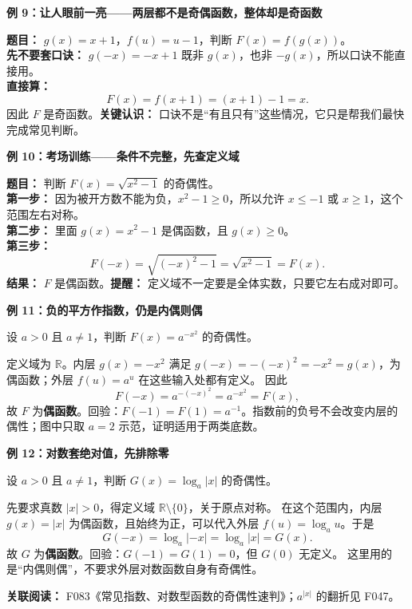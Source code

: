 \clearpage
\begin{examplebox}
\textbf{\textcolor{CExample}{例 9：让人眼前一亮——两层都不是奇偶函数，整体却是奇函数}}


\textbf{题目：} $g(x)=x+1$，$f(u)=u-1$，判断 $F(x)=f(g(x))$。\\
\textbf{先不要套口诀：} $g(-x)=-x+1$ 既非 $g(x)$，也非 $-g(x)$，所以口诀不能直接用。\\
\textbf{直接算：}
\[
F(x)=f(x+1)=(x+1)-1=x.
\]
因此 $F$ 是奇函数。\textbf{关键认识：} 口诀不是“有且只有”这些情况，它只是帮我们最快完成常见判断。

\medskip

\end{examplebox}
\clearpage
\begin{examplebox}
\textbf{\textcolor{CExample}{例 10：考场训练——条件不完整，先查定义域}}


\textbf{题目：} 判断 $F(x)=\sqrt{x^2-1}$ 的奇偶性。\\
\textbf{第一步：} 因为被开方数不能为负，$x^2-1\geqslant0$，所以允许 $x\leqslant-1$ 或 $x\geqslant1$，这个范围左右对称。\\
\textbf{第二步：} 里面 $g(x)=x^2-1$ 是偶函数，且 $g(x)\geqslant0$。\\
\textbf{第三步：}
\[
F(-x)=\sqrt{(-x)^2-1}=\sqrt{x^2-1}=F(x).
\]
\textbf{结果：} $F$ 是偶函数。\textbf{提醒：} 定义域不一定要是全体实数，只要它左右成对即可。
\end{examplebox}
\clearpage
\begin{examplebox}
\textbf{\textcolor{CExample}{例 11：负的平方作指数，仍是内偶则偶}}

设 $a>0$ 且 $a\ne1$，判断 $F(x)=a^{-x^2}$ 的奇偶性。

定义域为 $\mathbb R$。内层 $g(x)=-x^2$ 满足
$g(-x)=-(-x)^2=-x^2=g(x)$，为偶函数；外层 $f(u)=a^u$ 在这些输入处都有定义。
因此
\[
F(-x)=a^{-(-x)^2}=a^{-x^2}=F(x),
\]
故 $F$ 为\textbf{偶函数}。回验：$F(-1)=F(1)=a^{-1}$。指数前的负号不会改变内层的偶性；图中只取 $a=2$ 示范，证明适用于两类底数。
\end{examplebox}
\clearpage
\begin{examplebox}
\textbf{\textcolor{CExample}{例 12：对数套绝对值，先排除零}}

设 $a>0$ 且 $a\ne1$，判断 $G(x)=\log_a|x|$ 的奇偶性。

先要求真数 $|x|>0$，得定义域 $\mathbb R\setminus\{0\}$，关于原点对称。
在这个范围内，内层 $g(x)=|x|$ 为偶函数，且始终为正，可以代入外层 $f(u)=\log_a u$。于是
\[
G(-x)=\log_a|-x|=\log_a|x|=G(x).
\]
故 $G$ 为\textbf{偶函数}。回验：$G(-1)=G(1)=0$，但 $G(0)$ 无定义。
这里用的是“内偶则偶”，不要求外层对数函数自身有奇偶性。

\textbf{关联阅读：} F083《常见指数、对数型函数的奇偶性速判》；$a^{|x|}$ 的翻折见 F047。
\end{examplebox}
